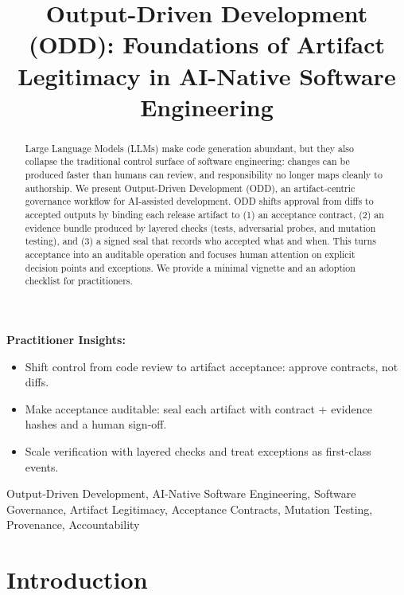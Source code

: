 \documentclass[conference]{IEEEtran}
\begin{document}
\title{Output-Driven Development (ODD): Foundations of Artifact Legitimacy in AI-Native Software Engineering}

\author{
}

\maketitle

\begin{abstract}
Large Language Models (LLMs) make code generation abundant, but they also collapse the traditional control surface of software engineering: changes can be produced faster than humans can review, and responsibility no longer maps cleanly to authorship. We present Output-Driven Development (ODD), an artifact-centric governance workflow for AI-assisted development. ODD shifts approval from diffs to accepted outputs by binding each release artifact to (1) an acceptance contract, (2) an evidence bundle produced by layered checks (tests, adversarial probes, and mutation testing), and (3) a signed seal that records who accepted what and when. This turns acceptance into an auditable operation and focuses human attention on explicit decision points and exceptions. We provide a minimal vignette and an adoption checklist for practitioners.
\end{abstract}

\textbf{Practitioner Insights:}
\begin{itemize}
\item Shift control from code review to artifact acceptance: approve contracts, not diffs.
\item Make acceptance auditable: seal each artifact with contract + evidence hashes and a human sign-off.
\item Scale verification with layered checks and treat exceptions as first-class events.
\end{itemize}

\begin{IEEEkeywords}
Output-Driven Development, AI-Native Software Engineering, Software Governance, Artifact Legitimacy, Acceptance Contracts, Mutation Testing, Provenance, Accountability
\end{IEEEkeywords}

\section{Introduction}
\end{document}
